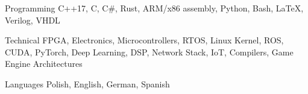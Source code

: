

\begin{cvskills}

  \cvskill
    {Programming} %
    {C++17, C, C\#, Rust, ARM/x86 assembly, Python, Bash, LaTeX, Verilog, VHDL} %

  \cvskill
    {Technical}
    {FPGA, Electronics, Microcontrollers, RTOS, Linux Kernel, ROS, CUDA, PyTorch, Deep Learning, DSP, Network Stack, IoT, Compilers, Game Engine Architectures}

  \cvskill
    {Languages} %
    {Polish, English, German, Spanish} %

\end{cvskills}
